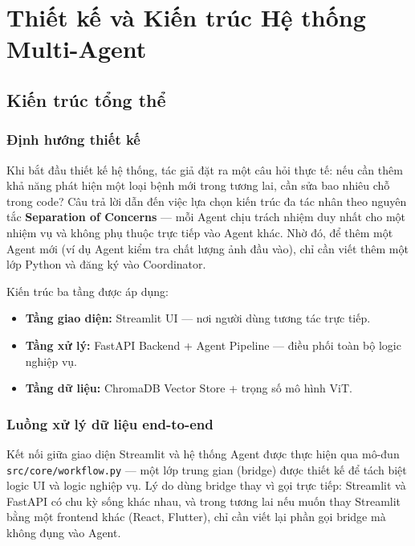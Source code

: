 \chapter{Thiết kế và Kiến trúc Hệ thống Multi-Agent}

\section{Kiến trúc tổng thể}

\subsection{Định hướng thiết kế}
Khi bắt đầu thiết kế hệ thống, tác giả đặt ra một câu hỏi thực tế: nếu cần thêm khả năng phát hiện một loại bệnh mới trong tương lai, cần sửa bao nhiêu chỗ trong code? Câu trả lời dẫn đến việc lựa chọn kiến trúc đa tác nhân theo nguyên tắc \textbf{Separation of Concerns} --- mỗi Agent chịu trách nhiệm duy nhất cho một nhiệm vụ và không phụ thuộc trực tiếp vào Agent khác. Nhờ đó, để thêm một Agent mới (ví dụ Agent kiểm tra chất lượng ảnh đầu vào), chỉ cần viết thêm một lớp Python và đăng ký vào Coordinator.

Kiến trúc ba tầng được áp dụng:
\begin{itemize}[leftmargin=1.5cm]
    \item \textbf{Tầng giao diện:} Streamlit UI --- nơi người dùng tương tác trực tiếp.
    \item \textbf{Tầng xử lý:} FastAPI Backend + Agent Pipeline --- điều phối toàn bộ logic nghiệp vụ.
    \item \textbf{Tầng dữ liệu:} ChromaDB Vector Store + trọng số mô hình ViT.
\end{itemize}

\subsection{Luồng xử lý dữ liệu end-to-end}
Kết nối giữa giao diện Streamlit và hệ thống Agent được thực hiện qua mô-đun \texttt{src/core/workflow.py} --- một lớp trung gian (bridge) được thiết kế để tách biệt logic UI và logic nghiệp vụ. Lý do dùng bridge thay vì gọi trực tiếp: Streamlit và FastAPI có chu kỳ sống khác nhau, và trong tương lai nếu muốn thay Streamlit bằng một frontend khác (React, Flutter), chỉ cần viết lại phần gọi bridge mà không đụng vào Agent.

